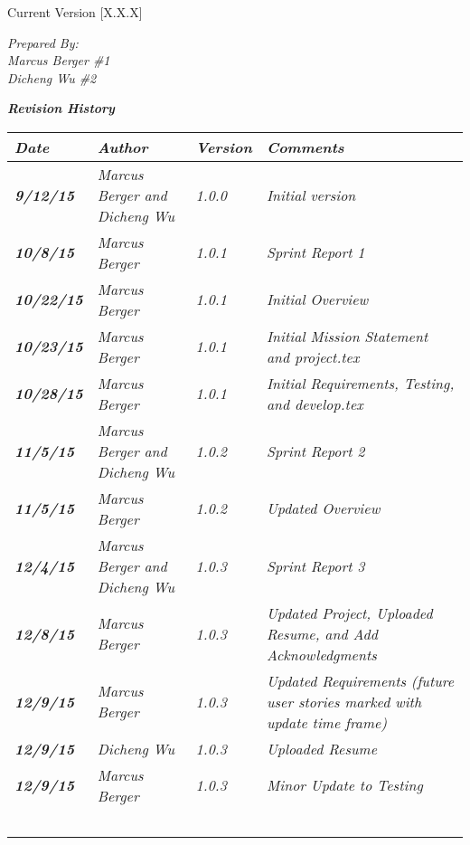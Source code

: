 


Current Version [X.X.X]
\vspace*{5mm}

{\color{MSBlue3}
\noindent
\textit{Prepared By:}\\
\textit{Marcus Berger \#1}\\
\textit{Dicheng Wu \#2}\\
}

\vfill
\noindent
{\color{color02} \textit{\textbf{Revision History}}}\\
\begin{tabular}{|>{\raggedright}p{1.5cm}|>{\raggedright}p{3cm}|>{\raggedright}p{1.5cm}|>{\raggedright}p{9cm}|}
\hline
\textit{\textbf{Date}} &  \textit{\textbf{Author}} & \textit{\textbf{Version}} & \textit{\textbf{Comments}}\tabularnewline
\hline
 \textit{\textbf{9/12/15}} & \textit{Marcus Berger and Dicheng Wu} & \textit{1.0.0} & \textit{Initial version}\tabularnewline
\hline
\textit{\textbf{10/8/15}} & \textit{Marcus Berger} & \textit{1.0.1} & \textit{Sprint Report 1}\tabularnewline
\hline
\textit{\textbf{10/22/15}} & \textit{Marcus Berger} & \textit{1.0.1} & \textit{Initial Overview}\tabularnewline
\hline
\textit{\textbf{10/23/15}} & \textit{Marcus Berger} & \textit{1.0.1} & \textit{Initial Mission Statement and project.tex}\tabularnewline
\hline
\textit{\textbf{10/28/15}} & \textit{Marcus Berger} & \textit{1.0.1} & \textit{Initial Requirements, Testing, and develop.tex }\tabularnewline
\hline
\textit{\textbf{11/5/15}} & \textit{Marcus Berger and Dicheng Wu} & \textit{1.0.2} & \textit{Sprint Report 2}\tabularnewline
\hline
\textit{\textbf{11/5/15}} & \textit{Marcus Berger} & \textit{1.0.2} & \textit{Updated Overview}\tabularnewline
\hline
\textit{\textbf{12/4/15}} & \textit{Marcus Berger and Dicheng Wu} & \textit{1.0.3} & \textit{Sprint Report 3}\tabularnewline
\hline
\textit{\textbf{12/8/15}} & \textit{Marcus Berger} & \textit{1.0.3} & \textit{Updated Project, Uploaded Resume, and Add Acknowledgments}\tabularnewline
\hline
\textit{\textbf{12/9/15}} & \textit{Marcus Berger} & \textit{1.0.3} & \textit{Updated Requirements (future user stories marked with update time frame) }\tabularnewline
\hline
\textit{\textbf{12/9/15}} & \textit{Dicheng Wu} & \textit{1.0.3} & \textit{Uploaded Resume}\tabularnewline
\hline
\textit{\textbf{12/9/15}} & \textit{Marcus Berger} & \textit{1.0.3} & \textit{Minor Update to Testing}\tabularnewline
\hline
 &  &  & \tabularnewline
 \hline
 &  &  & \tabularnewline
\hline
 &  &  & \tabularnewline
\hline
 &  &  & \tabularnewline
\hline
 &  &  & \tabularnewline
\hline
\end{tabular}
\vfill


